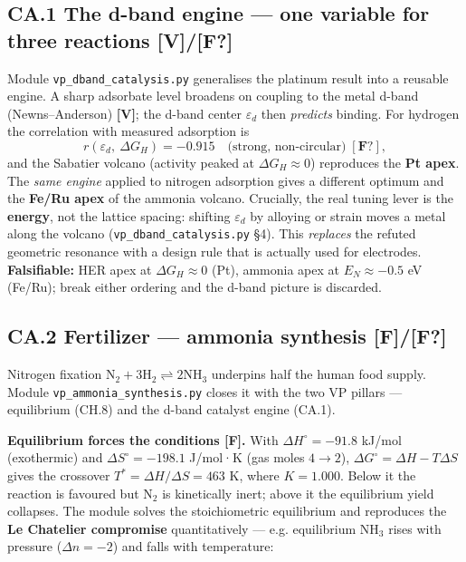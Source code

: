 \documentclass[
  10pt,
]{article}
\begin{document}
\hypertarget{ca.1-the-d-band-engine-one-variable-for-three-reactions-vf}{%
\subsection{\texorpdfstring{CA.1 The d-band engine --- one variable for
three reactions
\textbf{{[}V{]}/{[}F?{]}}}{CA.1 The d-band engine --- one variable for three reactions {[}V{]}/{[}F?{]}}}\label{ca.1-the-d-band-engine-one-variable-for-three-reactions-vf}}

Module \texttt{vp\_dband\_catalysis.py} generalises the platinum result
into a reusable engine. A sharp adsorbate level broadens on coupling to
the metal d-band (Newns--Anderson) \textbf{{[}V{]}}; the d-band center
\(\varepsilon_d\) then \emph{predicts} binding. For hydrogen the
correlation with measured adsorption is
\[ r(\varepsilon_d,\ \Delta G_H) = -0.915 \quad\text{(strong, non-circular)} \;[\mathbf{F?}], \]
and the Sabatier volcano (activity peaked at \(\Delta G_H\approx 0\))
reproduces the \textbf{Pt apex}. The \emph{same engine} applied to
nitrogen adsorption gives a different optimum and the \textbf{Fe/Ru
apex} of the ammonia volcano. Crucially, the real tuning lever is the
\textbf{energy}, not the lattice spacing: shifting \(\varepsilon_d\) by
alloying or strain moves a metal along the volcano
(\texttt{vp\_dband\_catalysis.py} §4). This \emph{replaces} the refuted
geometric resonance with a design rule that is actually used for
electrodes. \textbf{Falsifiable:} HER apex at \(\Delta G_H\approx0\)
(Pt), ammonia apex at \(E_N\approx-0.5\) eV (Fe/Ru); break either
ordering and the d-band picture is discarded.

\hypertarget{ca.2-fertilizer-ammonia-synthesis-ff}{%
\subsection{\texorpdfstring{CA.2 Fertilizer --- ammonia synthesis
\textbf{{[}F{]}/{[}F?{]}}}{CA.2 Fertilizer --- ammonia synthesis {[}F{]}/{[}F?{]}}}\label{ca.2-fertilizer-ammonia-synthesis-ff}}

Nitrogen fixation \(\mathrm{N_2 + 3H_2 \rightleftharpoons 2NH_3}\)
underpins half the human food supply. Module
\texttt{vp\_ammonia\_synthesis.py} closes it with the two VP pillars ---
equilibrium (CH.8) and the d-band catalyst engine (CA.1).

\textbf{Equilibrium forces the conditions {[}F{]}.} With
\(\Delta H^\circ=-91.8\) kJ/mol (exothermic) and
\(\Delta S^\circ=-198.1\) J/mol·K (gas moles \(4\to2\)),
\(\Delta G^\circ=\Delta H-T\Delta S\) gives the crossover
\(T^{*} = \Delta H/\Delta S = 463\) K, where \(K=1.000\). Below it the
reaction is favoured but \(\mathrm{N_2}\) is kinetically inert; above it
the equilibrium yield collapses. The module solves the stoichiometric
equilibrium and reproduces the \textbf{Le Chatelier compromise}
quantitatively --- e.g. equilibrium \(\mathrm{NH_3}\) rises with
pressure (\(\Delta n=-2\)) and falls with temperature:
\end{document}

